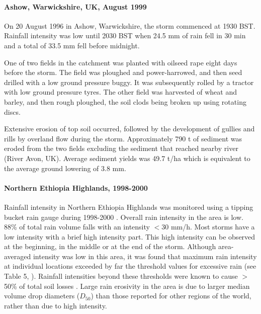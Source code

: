 \paragraph{Ashow, Warwickshire, UK, August 1999 \citep{harrison1999-143}}
\label{sec:AshowWarwickshireUK}
On 20 August 1996 in Ashow, Warwickshire, the storm commenced at 1930 BST.
Rainfall intensity was low until 2030 BST when 24.5 mm of rain fell in 30 min
and a total of 33.5 mm fell before midnight.

One of two fields in the catchment was planted with oilseed rape eight days
before the storm. The field was ploughed and power-harrowed, and then seed
drilled with a low ground pressure buggy. It was subsequently rolled by a
tractor with low ground pressure tyres. The other field was harvested of wheat
and barley, and then rough ploughed, the soil clods being broken up using
rotating discs.

Extensive erosion of top soil occurred, followed by the development of gullies
and rills by overland flow during the storm. Approximately 790 t of sediment was
eroded from the two fields excluding the sediment that reached nearby river
(River Avon, UK). Average sediment yields was 49.7 t/ha which is equivalent to
the average ground lowering of 3.8 mm.

\paragraph{Northern Ethiopia Highlands, 1998-2000 \citep{nyssen2005-172}}
\label{sec:NorthernEthiopiaHighlands}

Rainfall intensity in Northern Ethiopia Highlands was monitored using a tipping
bucket rain gauge during 1998-2000 \citep{nyssen2005-172}. Overall rain
intensity in the area is low. 88\% of total rain volume falls with an intensity
$<$30 mm/h. Most storms have a low intensity with a brief high intensity part.
This high intensity can be observed at the beginning, in the middle or at the
end of the storm.
Although area-averaged intensity was low in this area, it was found that maximum
rain intensity at individual locations exceeded by far the threshold values for
excessive rain (see Table 5, \citealp{nyssen2005-172}). Rainfall intensities
beyond these thresholds were known to cause $>$50\% of total soil losses
\citep{krauer1988-rainfallerosivityand}. Large rain erosivity in the area is due
to larger median volume drop diameters ($D_{50}$) than those reported for other
regions of the world, rather than due to high intensity.

